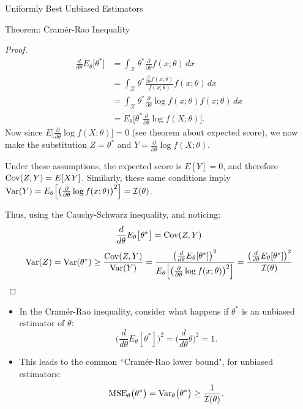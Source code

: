 \begin{frame}[allowframebreaks]{Uniformly Best Unbiased Estimators}
\begin{block}{Theorem: Cram\'er-Rao Inequality}
{\begin{proof}
      \begin{align*}
        \frac{d}{d\theta} E_\theta\big[\theta^*\big] &= \int_\mathcal{X} \theta^* \frac{\partial}{\partial \theta} f(x; \theta)\, dx \\
        &= \int_{\mathcal{X}} \theta^* \frac{\frac{\partial}{\partial \theta} f(x; \theta)}{f(x; \theta)}f(x; \theta)\, dx \\
        &=  \int_{\mathcal{X}} \theta^* \frac{\partial}{\partial \theta} \log f(x; \theta) f(x;\theta)\, dx \\
        &= E_\theta\Big[\theta^* \frac{\partial}{\partial \theta} \log f(X; \theta)\Big].
      \end{align*}
      Now since $E\Big[\frac{\partial}{\partial \theta} \log f(X; \theta)\Big] = 0$ (see theorem about expected score), we now make the substitution $Z = \theta^*$ and $Y = \frac{\partial}{\partial \theta} \log f(X; \theta)$.

      Under these assumptions, the expected score is $E[Y] = 0$, and therefore $\mathrm{Cov}(Z, Y) = E[XY]$. Similarly, these same conditions imply $\mathrm{Var}(Y) = E_\theta\Big[\big(\frac{\partial}{\partial \theta} \log f(x; \theta)\big)^2\Big] = \mathcal{I}(\theta)$.

       Thus, using the Cauchy-Schwarz inequality, and noticing:
      $$
      \frac{d}{d\theta} E_\theta\big[\theta^*\big] = \mathrm{Cov}(Z, Y)
      $$
      \begin{align*}
        \mathrm{Var}(Z) = \mathrm{Var}(\theta^*) \geq \frac{\mathrm{Cov}(Z, Y)}{\mathrm{Var}(Y)} = \frac{\big(\frac{d}{d\theta}E_\theta[\theta^*]\big)^2}{E_\theta\Big[\big(\frac{\partial}{\partial \theta} \log f(x; \theta)\big)^2\Big]} = \frac{\big(\frac{d}{d\theta}E_\theta[\theta^*]\big)^2}{\mathcal{I}(\theta)}
      \end{align*}

    \end{proof}
    }

  \end{block}

  \framebreak

    \begin{itemize}
      \item In the Cram\'er-Rao inequality, consider what happens if $\theta^*$ is an unbiased estimator of $\theta$:
      $$
      \Big(\frac{d}{d\theta}E_\theta[\theta^*]\Big)^2 = \Big(\frac{d}{d\theta}\theta\Big)^2 = 1.
      $$
      \item This leads to the common ``Cram\'er-Rao lower bound", for unbiased estimators:
      $$
      \text{MSE}_\theta\big(\theta^*\big) = \mathrm{Var}_\theta\big(\theta^*\big) \geq \frac{1}{\mathcal{I}(\theta)}.
      $$
    \end{itemize}


\end{frame}
